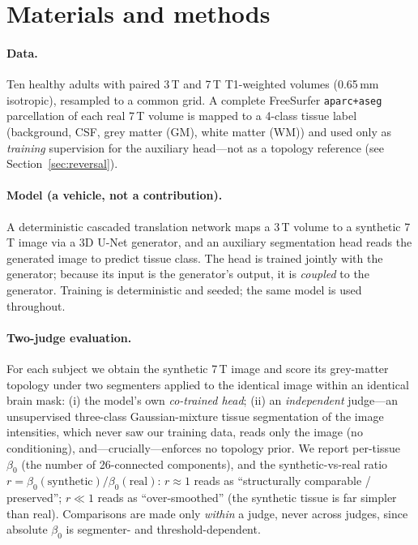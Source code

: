 \documentclass[11pt,a4paper]{article}
\begin{document}
\section{Materials and methods}
\paragraph{Data.} Ten healthy adults with paired 3\,T and 7\,T T1-weighted volumes
(0.65\,mm isotropic), resampled to a common grid. A complete FreeSurfer \texttt{aparc+aseg}
parcellation of each real 7\,T volume is mapped to a 4-class tissue label
(background, CSF, grey matter (GM), white matter (WM)) and used only as \emph{training}
supervision for the auxiliary head---not as a topology reference (see Section~\ref{sec:reversal}).

\paragraph{Model (a vehicle, not a contribution).} A deterministic cascaded translation network
maps a 3\,T volume to a synthetic 7\,T image via a 3D U-Net generator, and an auxiliary
segmentation head reads the generated image to predict tissue class. The head is trained jointly
with the generator; because its input is the generator's output, it is \emph{coupled} to the
generator. Training is deterministic and seeded; the same model is used throughout.

\paragraph{Two-judge evaluation.} For each subject we obtain the synthetic 7\,T image and score its
grey-matter topology under two segmenters applied to the identical image within an identical brain
mask: (i) the model's own \emph{co-trained head}; (ii) an \emph{independent} judge---an
unsupervised three-class Gaussian-mixture tissue segmentation of the image intensities, which never
saw our training data, reads only the image (no conditioning), and---crucially---enforces no
topology prior. We report per-tissue $\beta_0$ (the number of 26-connected components), and the
synthetic-vs-real ratio $r = \beta_0(\text{synthetic})/\beta_0(\text{real})$: $r\!\approx\!1$ reads
as ``structurally comparable / preserved''; $r\!\ll\!1$ reads as ``over-smoothed'' (the synthetic
tissue is far simpler than real). Comparisons are made only \emph{within} a judge, never across
judges, since absolute $\beta_0$ is segmenter- and threshold-dependent.
\end{document}
